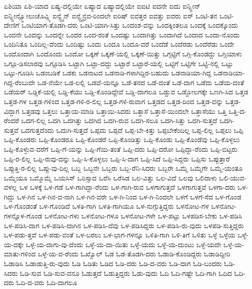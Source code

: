 {ಏಶಿಯಾ
ಏಶಿ-ಯಾದ
ಏಷ್ಯ-ದಲ್ಲಿಯೇ
ಏಷ್ಯಾದ
ಏಷ್ಯಾದಲ್ಲಿಯೇ
ಐಐಟಿ
ಐದನೇ
ಐದು
ಐನ್ಸ್ಟೀನ್
ಐನ್ಸ್ಟೀನ್ಸ್ಮೋಲುಚೊವ್ಸ್ಕಿ
ಐನ್ಸ್ಟೈನ್
ಐನ್ಸ್ಟೈನ್ರವ-ರಿಂದಲೇ
ಐರಿಷ್
ಐವತ್ತರ
ಐವತ್ತು
ಐವರು
ಐಸ್
ಒಂಟಿ-ತನ
ಒಂಟಿ-ದೇಣಿಗೆ
ಒಂಟಿಯಾಗ-ತೊಡಗಿ-ದರು
ಒಂಟಿ-ಯಾಗಿ-ಸಿತ್ತು
ಒಂದಂಶ-ವನ್ನು
ಒಂದಕ್ಕಿಂತಲೂ
ಒಂದಕ್ಕೆ
ಒಂದಕ್ಕೊಂದು
ಒಂದನೇ
ಒಂದನ್ನು
ಒಂದನ್ನೇ
ಒಂದರ
ಒಂದ-ರಂತೆ
ಒಂದಷ್ಟು
ಒಂದಾಗಿತ್ತು
ಒಂದಾಗಿದೆ
ಒಂದಾದ
ಒಂದಾ-ನೊಂದು
ಒಂದಿನಿತೂ
ಒಂದಿಲ್ಲ-ವೆಂದು
ಒಂದಿಷ್ಟು
ಒಂದು
ಒಂದೂ
ಒಂದೂ-ವರೆ
ಒಂದೆಡೆ
ಒಂದೆರಡು
ಒಂದೆರೆಡು
ಒಂದೇ
ಒಂದೊಂದಾಗಿ
ಒಂದೊಂದು
ಒಂದೋ
ಒಕ್ಕಣೆ
ಒಕ್ಕಣೆ-ಯಲ್ಲಿ
ಒಕ್ಕಣೆ-ಯಿತ್ತು
ಒಗ್ಗಟ್ಟಿಗೆ
ಒಗ್ಗಿ-ಕೊಂಡದ್ದು
ಒಗ್ಗಿಯಾಳು
ಒಗ್ಗೂ-ಡಿಸಲಾರವು
ಒಗ್ಗೂಡಿಸಿ
ಒಟ್ಟಾಗಿ
ಒಟ್ಟಾ-ದದ್ದು
ಒಟ್ಟಾರೆ
ಒಟ್ಟಾರೆ-ಯಲ್ಲಿ
ಒಟ್ಟಿಗೆ
ಒಟ್ಟಿಗೇ
ಒಟ್ಟಿ-ನಲ್ಲಿ
ಒಟ್ಟು
ಒಟ್ಟು-ಗೂಡಿಸಿ
ಒಡಂಬಡಿಕೆ
ಒಡಕು
ಒಡನಾಟದ
ಒಡನಾಡಿ-ಗಳಾಗಿದ್ದಿರ-ಬಹುದು
ಒಡನಾಡಿಯಾ-ಗಿದ್ದ
ಒಡನಾಡಿಯಾ-ಗಿದ್ದ-ರೆಂಬುದೇ
ಒಡ-ನೆಯೇ
ಒಡ-ಲಲ್ಲಿ
ಒಡವೆ-ಯನ್ನೂ
ಒಡೆ-ತನದ
ಒಡೆ-ದಂತೆ
ಒಡೆ-ದಾಗ
ಒಡೆದು
ಒಡೆಯ-ದಂತೆ
ಒಡೆಯರ್
ಒಡ್ಡಿಕೆ-ಯಲ್ಲಿ
ಒಡ್ಡಿ-ಕೆಯು
ಒಡ್ಡಿ-ಕೊಂಡಿದ್ದೇವೆ
ಒಡ್ಡಿ-ದಾಗಲೂ
ಒಡ್ಡುವ
ಒಡ್ಡೋಲಗಕ್ಕೇ
ಒಣಗಿ-ಸಿದ
ಒತ್ತಡ
ಒತ್ತಡ-ಗಳ
ಒತ್ತಡ-ಗಳಿಂದ
ಒತ್ತಡ-ಗಳಿ-ರ-ಲಿಲ್ಲ
ಒತ್ತಡ-ಗಳಿ-ರುವಾಗ
ಒತ್ತಡದ
ಒತ್ತಡ-ದಿಂದ
ಒತ್ತಡ-ವನ್ನು
ಒತ್ತಡ-ವಿದ್ದಾಗ
ಒತ್ತಡವು
ಒತ್ತಲು
ಒತ್ತಾಯ-ಮಾಡಿ
ಒತ್ತಾಯಿ-ಸಿದರು
ಒತ್ತಾಸೆ
ಒತ್ತಾಸೆ-ಯಿಂದಲೇ
ಒತ್ತಾಸೆಯು
ಒತ್ತಿ
ಒತ್ತಿ-ದ-ರೆಂದರೆ
ಒದಗ-ಲಿಲ್ಲ
ಒದಗಿ
ಒದಗಿತ್ತು
ಒದಗಿದ
ಒದಗಿ-ರುವ
ಒದಗಿ-ಸಲೂ
ಒದಗಿ-ಸಿತ್ತು
ಒದಗಿ-ಸುತ್ತದೆ
ಒದಗಿ-ಸುತ್ತವೆ
ಒದಗುತ್ತದೆಂದು
ಒದುಗಿ-ಸುತ್ತದೆ
ಒಪ್ಪದು
ಒಪ್ಪದೆ
ಒಪ್ಪ-ಬೇ-ಕಿತ್ತು
ಒಪ್ಪಬೇಕೆಂದಿಲ್ಲ
ಒಪ್ಪ-ಲಿಲ್ಲ
ಒಪ್ಪಲು
ಒಪ್ಪಿ
ಒಪ್ಪಿ-ಕೊಂಡರು
ಒಪ್ಪಿ-ಕೊಂಡರೂ
ಒಪ್ಪಿ-ಕೊಂಡರೆ
ಒಪ್ಪಿ-ಕೊಂಡಿತ್ತು
ಒಪ್ಪಿ-ಕೊಂಡು
ಒಪ್ಪಿ-ಕೊಂಡೆವು
ಒಪ್ಪಿ-ಕೊಳ್ಳಲು
ಒಪ್ಪಿ-ಕೊಳ್ಳುವ-ವರೆಗೆ
ಒಪ್ಪಿ-ಗೆ-ಯನ್ನು
ಒಪ್ಪಿ-ಗೆಯಿ-ತಂತೆ
ಒಪ್ಪಿ-ದರು
ಒಪ್ಪಿ-ದರೋ
ಒಪ್ಪಿದ್ದಾ-ರೆಂದು
ಒಪ್ಪಿ-ಬಿಟ್ಟರು
ಒಪ್ಪಿ-ರ-ಲಿಲ್ಲ
ಒಪ್ಪಿ-ರುವು-ದನ್ನು
ಒಪ್ಪಿ-ಸಿ-ಕೊಳ್ಳಲು
ಒಪ್ಪಿ-ಸಿ-ದಾಗ
ಒಪ್ಪಿ-ಸಿದೆ
ಒಪ್ಪಿ-ಸಿದ್ದರು
ಒಪ್ಪಿಸು
ಒಪ್ಪುತ್ತಾರೆ
ಒಪ್ಪುತ್ತಿ-ರ-ಲಿಲ್ಲ
ಒಪ್ಪು-ವು-ದಿಲ್ಲ
ಒಬ್ಬ
ಒಬ್ಬನೇ
ಒಬ್ಬರು
ಒಬ್ಬ-ರೆನಿ-ಸಿದರು
ಒಬ್ಬರೇ
ಒಮ್ಮೆ
ಒಮ್ಮೆಗೇ
ಒಮ್ಮೆ-ಯಂತೂ
ಒಮ್ಮೆಯೂ
ಒಮ್ಮೊಮ್ಮೆ
ಒಯಸಿಸ್
ಒರಿಸ್ಸಾದ
ಒರೆಸಿ
ಒರೆಸಿಡ
ಒಲ-ವಿತ್ತು
ಒಲ-ವಿದೆ
ಒಲವು
ಒಲಿದಾಳು
ಒಲಿ-ಯುವ-ವಳಲ್ಲ
ಒಳ
ಒಳಕ್ಕೆ
ಒಳ-ಗಡೆ
ಒಳ-ಗಾಗಿದ್ದಾ-ರೆಂದು
ಒಳ-ಗಾಗಿ-ರುವ
ಒಳಗಾಗುತ್ತದೆ
ಒಳಗಾಗುತ್ತವೆ
ಒಳಗಾ-ದರು
ಒಳ-ಗಿದ್ದು
ಒಳ-ಗಿನ
ಒಳ-ಗಿನ-ವ-ನಾಗಿ
ಒಳ-ಗಿನ-ವರೇ
ಒಳ-ಗಿ-ನಿಂದ
ಒಳ-ಗಿ-ನಿಂದಲೇ
ಒಳಗೆ
ಒಳಗೆ-ಸೆದ
ಒಳ-ಗೊಂಡ
ಒಳ-ಗೊಂಡಂತೆ
ಒಳ-ಗೊಂಡಿದೆ
ಒಳತಿ-ಗಾಗಿ
ಒಳತಿ-ಗಾಗಿಯೂ
ಒಳ-ನುಗ್ಗುತ್ತಿದ್ದರು
ಒಳನೋಟ-ಗಳ
ಒಳನೋಟ-ಗಳನ್ನೊಳ-ಗೊಂಡ
ಒಳನೋಟ-ಗಳು
ಒಳನೋಟ-ಗಳೂ
ಒಳನೋಟ-ಗಳೇ
ಒಳ-ಪಟ್ಟು
ಒಳಪಡಿಸ-ಬೇಕು
ಒಳ-ಪಡಿಸಿ
ಒಳ-ಪಡಿಸಿ-ದಾಗ
ಒಳ-ಪಡಿಸಿ-ದಾಗಿನ
ಒಳ-ಪಡಿಸಿ-ದೆವು
ಒಳ-ಪಡಿಸಿದ್ದರು
ಒಳ-ಪಡಿಸಿ-ರು-ವುದು
ಒಳಪಡಿ-ಸುತ್ತಿದ್ದರು
ಒಳ-ಪಡು-ತ್ತವೆ
ಒಳ-ಪಡು-ವಂತೆ
ಒಳ-ಬರಲು
ಒಳ-ಭಾಗ-ಗಳನ್ನೂ
ಒಳಿತಿ-ಗಾಗಿ
ಒಳಿ-ತಿಗೆ
ಒಳಿತು
ಒಳ್ಳೆ
ಒಳ್ಳೆಯ
ಒಳ್ಳೆ-ಯ-ದಕ್ಕೇ
ಒಳ್ಳೆ-ಯ-ದಾಗು-ವು-ದೆಂದು
ಒಳ್ಳೆ-ಯ-ದಾ-ಯಿತು
ಒಳ್ಳೆ-ಯದು
ಒಳ್ಳೆ-ಯ-ದುಂಟು
ಒಳ್ಳೆ-ಯದೇ
ಒಳ್ಳೆ-ಯ-ಮಾತು-ಗಳಿಂದ
ಒಳ್ಳೆ-ಯ-ವ-ರೆಂದು
ಓಖ್ವೊಲ್
ಓಡ
ಓಡ-ತೊಡಗಿ-ದರು
ಓಡಾಡಿ-ಕೊಂಡಿದ್ದರು
ಓಡಾಡಿದ್ದೀರಿ
ಓಡಾಡಿಸಿ
ಓಡಾಡುತ್ತಿ-ರು-ವುದು
ಓಡಿ
ಓಡಿತು
ಓಡಿದ
ಓಡಿ-ದರು
ಓಡಿ-ದ-ವರು
ಓಡಿ-ದಾಗ
ಓಡಿ-ಬಂದರು
ಓಡಿ-ಸಿದರು
ಓಡಿ-ಸುವ
ಓಡಿ-ಸುವ-ವನೂ
ಓಡುತ್ತದೆ
ಓಡುತ್ತಿದ್ದರು
ಓಡು-ವುದು
ಓದಿ
ಓದಿ-ಗಷ್ಟೇ
ಓದಿ-ಗಾಗಿ
ಓದಿದ
ಓದಿ-ದರು
ಓದಿ-ದ-ವರು
ಓದಿ-ದಾಗಲೂ
}
